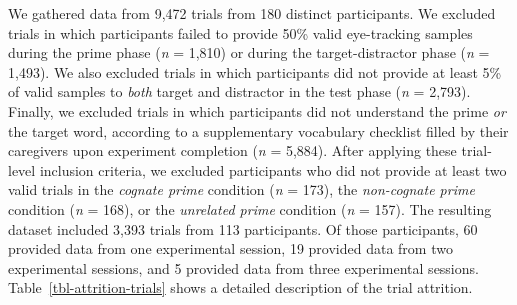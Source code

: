 \documentclass[
  letterpaper,
  DIV=11,
  numbers=noendperiod]{scrartcl}
\begin{document}
We gathered data from 9,472 trials from 180 distinct participants. We
excluded trials in which participants failed to provide 50\% valid
eye-tracking samples during the prime phase (\emph{n} = 1,810) or during
the target-distractor phase (\emph{n} = 1,493). We also excluded trials
in which participants did not provide at least 5\% of valid samples to
\emph{both} target and distractor in the test phase (\emph{n} = 2,793).
Finally, we excluded trials in which participants did not understand the
prime \emph{or} the target word, according to a supplementary vocabulary
checklist filled by their caregivers upon experiment completion
(\emph{n} = 5,884). After applying these trial-level inclusion criteria,
we excluded participants who did not provide at least two valid trials
in the \emph{cognate prime} condition (\emph{n} = 173), the
\emph{non-cognate prime} condition (\emph{n} = 168), or the
\emph{unrelated prime} condition (\emph{n} = 157). The resulting dataset
included 3,393 trials from 113 participants. Of those participants, 60
provided data from one experimental session, 19 provided data from two
experimental sessions, and 5 provided data from three experimental
sessions. Table~\ref{tbl-attrition-trials} shows a detailed description
of the trial attrition.
\end{document}
